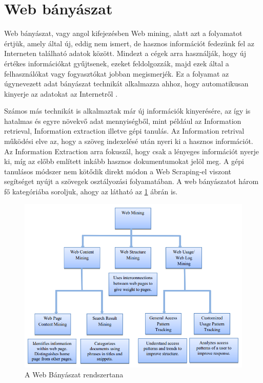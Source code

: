 \section{Web bányászat}

Web bányászat, vagy angol kifejezésben Web mining, alatt azt a folyamatot értjük, amely által új, eddig nem ismert, de hasznos információt fedezünk fel az Interneten található adatok között. Mindezt a cégek arra használják, hogy új értékes információkat gyűjtsenek, ezeket feldolgozzák, majd ezek által a felhasználókat vagy fogyasztókat jobban megismerjék. Ez a folyamat az úgynevezett adat bányászat technikát alkalmazza ahhoz, hogy automatikusan kinyerje az adatokat az Internetről \cite{gorunescu2011data}. 

Számos más technikát is alkalmaztak már új információk kinyerésére, az így is hatalmas és egyre növekvő adat mennyiségből, mint például az Information retrieval, Information extraction illetve gépi tanulás. Az Information retrival működési elve az, hogy a szöveg indexelésé után nyeri ki a hasznos információt. Az Information Extraction arra fokuszál, hogy csak a lényeges információt nyerje ki, míg az előbb említett inkább hasznos dokumentumokat jelöl meg. A gépi tanulásos módszer nem kötődik direkt módon a Web Scraping-el viszont segítséget nyújt a szövegek osztályozási folyamatában. A web bányászatot három fő kategóriába soroljuk, ahogy az látható az \ref{fig:web_mining_rendszertana} ábrán is.

\begin{figure}[h]
    \centering
    \includegraphics[scale=1, width=\textwidth]{figures/images/web_mining_rendszertan.png}
    \caption{A Web Bányászat rendszertana \cite{johnson2012web}}
    \label{fig:web_mining_rendszertana}
\end{figure}

